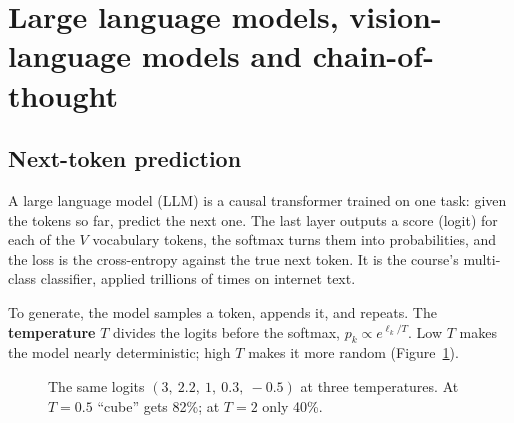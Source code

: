 \section{Large language models, vision-language models and chain-of-thought}

\subsection{Next-token prediction}
A large language model (LLM) is a causal transformer trained on one task: given the tokens so far, predict the next one. The last layer outputs a score (logit) for each of the $V$ vocabulary tokens, the softmax turns them into probabilities, and the loss is the cross-entropy against the true next token. It is the course's multi-class classifier, applied trillions of times on internet text.

To generate, the model samples a token, appends it, and repeats. The \textbf{temperature} $T$ divides the logits before the softmax, $p_k\propto e^{\ell_k/T}$. Low $T$ makes the model nearly deterministic; high $T$ makes it more random (Figure~\ref{fig:temp}).

\begin{figure}[h]
\centering
{}
\caption{The same logits $(3,\ 2.2,\ 1,\ 0.3,\ -0.5)$ at three temperatures. At $T=0.5$ ``cube'' gets 82\%; at $T=2$ only 40\%.}
\label{fig:temp}
\end{figure}

